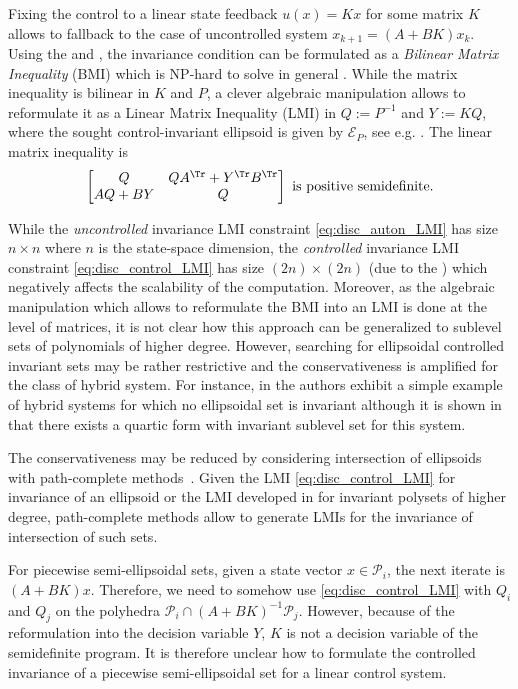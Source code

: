 \documentclass[11pt,twoside,a4paper,openright]{uclouvain-thesis}
\begin{document}
Fixing the control to a linear state feedback $u(x) = Kx$ for some matrix $K$ allows
to fallback to the case of uncontrolled system $x_{k+1} = (A + BK) x_k$.
Using the  and , the invariance condition can be formulated
as a \emph{Bilinear Matrix Inequality} (BMI) which is NP-hard to solve in general \cite{toker1995np}.
While the matrix inequality is bilinear in $K$ and $P$,
a clever algebraic manipulation allows to reformulate it as a
Linear Matrix Inequality (LMI) in $Q := P^{-1}$ and $Y := KQ$,
where the sought control-invariant ellipsoid is given by $\mathcal{E}_P$,
see e.g. \cite[Section~2.2.1]{blekherman2012semidefinite}.
The linear matrix inequality is
\begin{equation}
  \label{eq:disc_control_LMI}
  \begin{bmatrix}
    Q & QA^\Tr + Y^\Tr B^\Tr\\
    AQ + BY & Q
  \end{bmatrix} \text{ is positive semidefinite}.
\end{equation}

While the \emph{uncontrolled} invariance LMI constraint \eqref{eq:disc_auton_LMI} has size $n \times n$
where $n$ is the state-space dimension, the \emph{controlled} invariance LMI
constraint \eqref{eq:disc_control_LMI} has size $(2n) \times (2n)$ (due to the )
which negatively affects the scalability of the computation.
Moreover, as the algebraic manipulation which allows to reformulate the BMI into
an LMI is done at the level of matrices, it is not clear how this
approach can be generalized to sublevel sets of polynomials of higher degree.
However, searching for ellipsoidal controlled invariant sets may be rather
restrictive and the conservativeness is amplified for the class of hybrid system.
For instance, in \cite{ando1998simultaneous} the authors exhibit a simple example of hybrid
systems for which no ellipsoidal set is invariant
although it is shown in \cite[Example~2.8]{parrilo2008approximation} that there
exists a quartic form with invariant sublevel set for this system.

The conservativeness may be reduced by considering intersection of ellipsoids with
path-complete methods~\cite{ahmadi2014joint}.
Given the LMI \eqref{eq:disc_control_LMI} for invariance of
an ellipsoid or the LMI developed in  for invariant polysets of higher degree,
path-complete methods allow to generate LMIs for the invariance of intersection
of such sets.

For piecewise semi-ellipsoidal sets, given a state vector $x \in \mathcal{P}_i$,
the next iterate is $(A + BK)x$.
Therefore, we need to somehow use \eqref{eq:disc_control_LMI} with $Q_i$ and $Q_j$
on the polyhedra $\mathcal{P}_i \cap (A + BK)^{-1}\mathcal{P}_j$.
However, because of the reformulation into the decision variable $Y$,
$K$ is not a decision variable of the semidefinite program.
It is therefore unclear how to formulate the controlled invariance of a piecewise semi-ellipsoidal set
for a linear control system.
\end{document}
